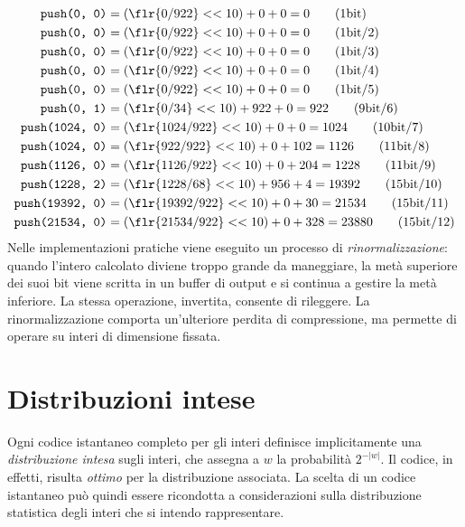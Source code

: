 \begin{align*}
	\texttt{push(0, 0)}     & = (\flr{0 / 922} << 10) + 0 + 0 = 0 \qquad (1 \textnormal{bit})                 \\
	\texttt{push(0, 0)}     & = (\flr{0 / 922} << 10) + 0 + 0 = 0 \qquad (1 \textnormal{bit} / 2)             \\
	\texttt{push(0, 0)}     & = (\flr{0 / 922} << 10) + 0 + 0 = 0  \qquad (1 \textnormal{bit} / 3)            \\
	\texttt{push(0, 0)}     & = (\flr{0 / 922} << 10) + 0 + 0 = 0 \qquad (1 \textnormal{bit} / 4)             \\
	\texttt{push(0, 0)}     & = (\flr{0 / 922} << 10) + 0 + 0 = 0 \qquad (1 \textnormal{bit} / 5)             \\
	\texttt{push(0, 1)}     & = (\flr{0 / 34} << 10) + 922 + 0 = 922 \qquad (9 \textnormal{bit} / 6)          \\
	\texttt{push(1024, 0)}  & = (\flr{1024 / 922} << 10) + 0 + 0 = 1024 \qquad (10 \textnormal{bit} / 7)      \\
	\texttt{push(1024, 0)}  & = (\flr{922 / 922} << 10) + 0 + 102 = 1126 \qquad (11 \textnormal{bit} / 8)     \\
	\texttt{push(1126, 0)}  & = (\flr{1126 / 922} << 10) + 0 + 204 = 1228 \qquad (11 \textnormal{bit} / 9)    \\
	\texttt{push(1228, 2)}  & = (\flr{1228 / 68} << 10) + 956 + 4 = 19392 \qquad (15 \textnormal{bit} / 10)   \\
	\texttt{push(19392, 0)} & = (\flr{19392 / 922} << 10) + 0 + 30 = 21534 \qquad (15 \textnormal{bit} / 11)  \\
	\texttt{push(21534, 0)} & = (\flr{21534 / 922} << 10) + 0 + 328 = 23880 \qquad (15 \textnormal{bit} / 12)
\end{align*}
Nelle implementazioni pratiche viene eseguito un processo di \textit{rinormalizzazione}: quando l'intero calcolato diviene troppo grande da maneggiare, la metà superiore dei suoi bit viene scritta in un buffer di output e si continua a gestire la metà inferiore. La stessa operazione, invertita, consente di rileggere. La rinormalizzazione comporta un'ulteriore perdita di compressione, ma permette di operare su interi di dimensione fissata.
\section{Distribuzioni intese}
Ogni codice istantaneo completo per gli interi definisce implicitamente una \textit{distribuzione intesa} sugli interi, che assegna a $w$ la probabilità $2^{-|w|}$. Il codice, in effetti, risulta \textit{ottimo} per la distribuzione associata. La scelta di un codice istantaneo può quindi essere ricondotta a considerazioni sulla distribuzione statistica degli interi che si intendo rappresentare.

